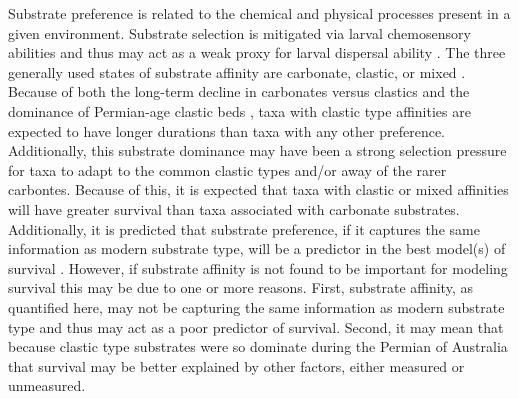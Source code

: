 \documentclass[12pt,letterpaper]{article}
\begin{document}
Substrate preference is related to the chemical and physical processes present in a given environment. Substrate selection is mitigated via larval chemosensory abilities and thus may act as a weak proxy for larval dispersal ability \citep{Jablonski2006a,Jablonski1983}. The three generally used states of substrate affinity are carbonate, clastic, or mixed \citep{Foote2006,Anderson2011a,Nurnberg2013a,Kiessling2007a,Miller2001}. Because of both the long-term decline in carbonates versus clastics \citep{Peters2008} and the dominance of Permian-age clastic beds \citep{Birgenheier2010,Percival2012,Thomas2007,Fielding2008a,Fielding2008}, taxa with clastic type affinities are expected to have longer durations than taxa with any other preference. Additionally, this substrate dominance may have been a strong selection pressure for taxa to adapt to the common clastic types and/or away of the rarer carbontes. Because of this, it is expected that taxa with clastic or mixed affinities will have greater survival than taxa associated with carbonate substrates. Additionally, it is predicted that substrate preference, if it captures the same information as modern substrate type, will be a predictor in the best model(s) of survival \citep{Richardson1997,Richardson1997a}. However, if substrate affinity is not found to be important for modeling survival this may be due to one or more reasons. First, substrate affinity, as quantified here, may not be capturing the same information as modern substrate type and thus may act as a poor predictor of survival. Second, it may mean that because clastic type substrates were so dominate during the Permian of Australia that survival may be better explained by other factors, either measured or unmeasured. 
\end{document}
